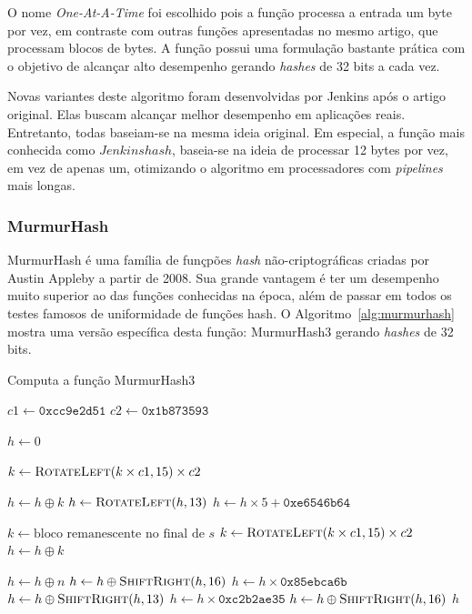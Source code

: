 O nome \emph{One-At-A-Time} foi escolhido pois a função processa a entrada um byte por vez, em contraste com outras funções apresentadas no mesmo artigo, que processam blocos de bytes. A função possui uma formulação bastante prática com o objetivo de alcançar alto desempenho gerando \emph{hashes} de 32 bits a cada vez. 

Novas variantes deste algoritmo foram desenvolvidas por Jenkins após o artigo original. Elas buscam alcançar melhor desempenho em aplicações reais. Entretanto, todas baseiam-se na mesma ideia original. Em especial, a função mais conhecida como $Jenkins hash$, baseia-se na ideia de processar 12 bytes por vez, em vez de apenas um, otimizando o algoritmo em processadores com \emph{pipelines} mais longas.

\subsubsection{MurmurHash}

MurmurHash é uma família de funçpões \emph{hash} não-criptográficas criadas por Austin Appleby a partir de 2008. Sua grande vantagem é ter um desempenho muito superior ao das funções conhecidas na época, além de passar em todos os testes famosos de uniformidade de funções hash. O Algoritmo~\ref{alg:murmurhash} mostra uma versão específica desta função: MurmurHash3 gerando \emph{hashes} de 32 bits.

\begin{algorithm}
\linespread{1}\selectfont
\caption{Computa a função MurmurHash3}
\label{alg:murmurhash}
\begin{algorithmic}[1]

    \State $c1 \gets \texttt{0xcc9e2d51}$
    \State $c2 \gets \texttt{0x1b873593}$
    
    \State $h \gets 0$
    
        \State $k \gets \Call{RotateLeft}{k \times c1, 15} \times c2$
        
        \State $h \gets h \oplus k$
        \State $h \gets \Call{RotateLeft}{h, 13}$
        \State $h \gets h \times 5 + \texttt{0xe6546b64}$
	\EndFor

        \State $k \gets \text{bloco remanescente no final de } s$
        \State $k \gets \Call{RotateLeft}{k \times c1, 15} \times c2$
        \State $h \gets h \oplus k$
    \EndIf
    
    \State $h \gets h \oplus n$
    \State $h \gets h \oplus \Call{ShiftRight}{h, 16}$
    \State $h \gets h \times \texttt{0x85ebca6b}$
    \State $h \gets h \oplus \Call{ShiftRight}{h, 13}$
    \State $h \gets h \times \texttt{0xc2b2ae35}$
    \State $h \gets h \oplus \Call{ShiftRight}{h, 16}$
    \Return $h$
\EndFunction
\end{algorithmic}
\end{algorithm}

